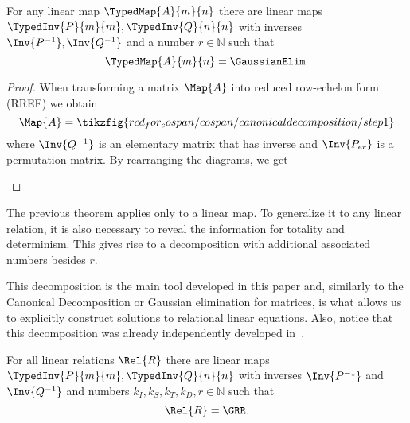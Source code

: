 \documentclass[manyauthors]{fundam}
\begin{document}
\begin{theorem}\label{thm:gaussian_elimination}
    For any linear map $\TypedMap{A}{m}{n}$ there are linear maps $\TypedInv{P}{m}{m}, \TypedInv{Q}{n}{n}$ with inverses $\Inv{P^{-1}}, \Inv{Q^{-1}}$ and a number $r \in \mathbb{N}$ such that
    \[\TypedMap{A}{m}{n} = \GaussianElim.\]
\end{theorem}
\begin{proof}
When transforming a matrix $\Map{A}$ into reduced row-echelon form (RREF) we obtain
\begin{equation}\label{eq:RREF}
    \Map{A} = \tikzfig{rcd_for_cospan/cospan/canonicaldecomposition/step1}
\end{equation}
where $\Inv{Q^{-1}}$ is an elementary matrix that has inverse and $\Inv{P_{er}}$ is a permutation matrix.
By rearranging the diagrams, we get

\begin{hcalculation}[=]{}
\end{hcalculation}
\end{proof}

The previous theorem applies only to a linear map.
To generalize it to any linear relation,
it is also necessary to reveal the information for totality and determinism.
This gives rise to a decomposition with additional associated numbers besides $r$.

This decomposition is the main tool developed in this paper and,
similarly to the Canonical Decomposition or Gaussian elimination for matrices,
is what allows us to explicitly construct solutions to relational linear equations.
Also, notice that this decomposition was already independently developed in~\cite[Lemma~48]{booth2024completeequationaltheoriesclassical}.

\begin{theorem}\label{thm:rcd_for_cospan}
For all linear relations $\Rel{R}$ there are linear maps $\TypedInv{P}{m}{m}, \TypedInv{Q}{n}{n}$ with inverses $\Inv{P^{-1}}$ and $\Inv{Q^{-1}}$ and numbers $k_I, k_S, k_T, k_D, r \in \mathbb{N}$ such that
\[ \Rel{R} = \GRR.\]
\end{theorem}
\end{document}
